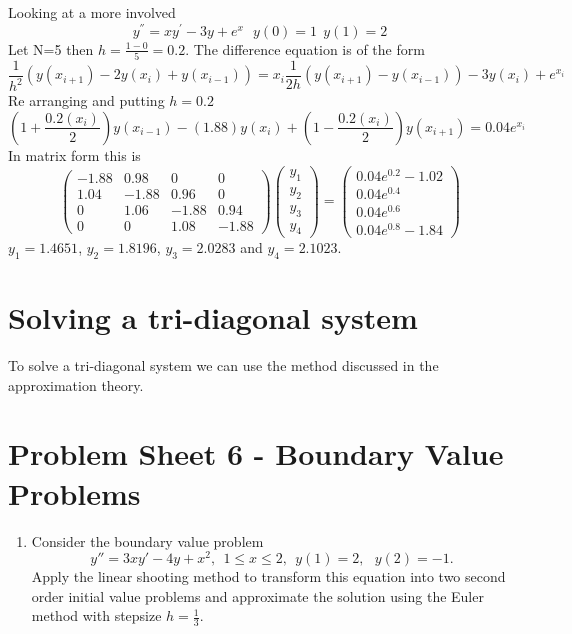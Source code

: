 \begin{example}
Looking at a more involved 
\[y^{''}=xy^{'}-3y+e^x \ \ \ y(0)=1 \ \ y(1)=2 \]
Let N=5 then $h=\frac{1-0}{5}=0.2$. The difference equation is of the form
\[
\frac{1}{h^2}(y(x_{i+1})-2y(x_i)+y(x_{i-1}))=x_i\frac{1}{2h}(y(x_{i+1})-y(x_{i-1}))-3y(x_i)+e^{x_i}\]
Re arranging and putting $h=0.2$
\[(1+\frac{0.2(x_i)}{2})y(x_{i-1})-(1.88)y(x_i)+(1-\frac{0.2(x_i)}{2})y(x_{i+1})=0.04e^{x_i} \]
In matrix form this is
\[\left(\begin{array}{cccc} -1.88&0.98&0&0\\
1.04&-1.88&0.96&0\\
0&1.06&-1.88&0.94\\
0&0&1.08&-1.88
\end{array}\right)
\left(\begin{array}{c} y_1\\
y_2\\
y_3\\
y_4
\end{array}\right)
=
\left(\begin{array}{c}
0.04e^{0.2}-1.02\\
0.04e^{0.4}\\
0.04e^{0.6}\\
0.04e^{0.8}-1.84 
\end{array}\right)
\]
$y_1=1.4651$, $y_2=1.8196$, $y_3=2.0283$ and $y_4=2.1023$.
\end{example}
\section*{Solving a tri-diagonal system}
To solve a tri-diagonal system we can use the method discussed in the approximation theory.

\newpage
\section{Problem Sheet 6 - Boundary Value Problems}
\begin{enumerate}
\item
	Consider the boundary value problem 
	\[y''=3xy'-4y+x^2, \ \ 1\leq x \leq 2, \ \ y(1)=2,\ \ \ y(2)=-1. \]
	Apply the linear shooting method to transform this equation into two second order initial value problems
	and approximate the solution using the Euler method with stepsize $h=\frac{1}{3}.$
\end{enumerate}